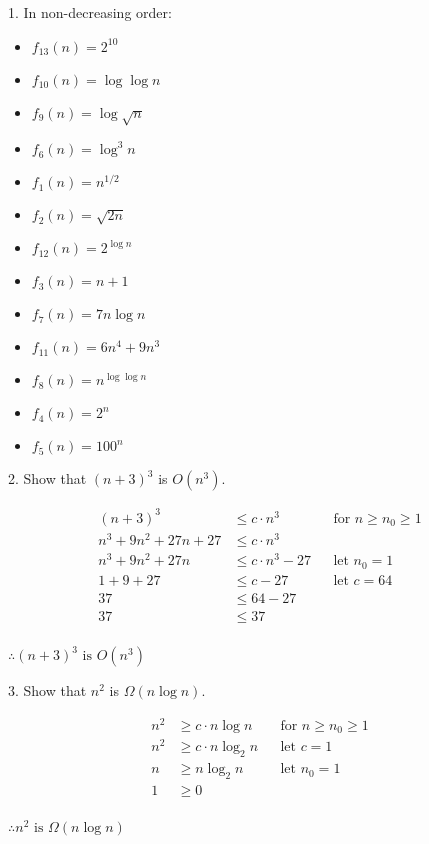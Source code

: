 \documentclass[12pt]{article}
\begin{document}
\begin{flushleft}
1. In non-decreasing order:
\end{flushleft}
\begin{itemize}
	\item $ f_{13}(n)=2^{10} $
    \item $ f_{10}(n)=\log \log n $
    \item $ f_{9}(n)=\log \sqrt{n} $
    \item $ f_{6}(n)=\log^3 n $
    \item $ f_{1}(n)=n^{1/2} $
    \item $ f_{2}(n)=\sqrt{2n} $
    \item $ f_{12}(n)=2^{\log n} $
    \item $ f_{3}(n)=n+1 $
    \item $ f_{7}(n)=7n\log n $
    \item $ f_{11}(n)=6n^4+9n^3 $
    \item $ f_{8}(n)=n^{\log \log n} $
    \item $ f_{4}(n)=2^n $
    \item $ f_{5}(n)=100^n $
\end{itemize}
\newpage

\begin{flushleft}
2. Show that $ (n+3)^3 $ is $ O(n^3) $.
\end{flushleft}
\begin{align*}
(n+3)^3 &\leq c\cdot n^3 &&\text{for } n \geq n_{0} \geq 1\\
n^3+9n^2+27n+27 &\leq c\cdot n^3\\
n^3+9n^2+27n &\leq c\cdot n^3-27 &&\text{let } n_{0}=1 \\
1 + 9 + 27 &\leq c-27 &&\text{let } c=64\\
37 &\leq 64-27\\
37 &\leq 37 \\
\end{align*}
\begin{center}
$ \therefore (n+3)^3 \text{ is } O(n^3) $ \\[1.5in]
\end{center}

\begin{flushleft}
3. Show that $ n^2 $ is $ \Omega(n\log n) $.
\end{flushleft}
\begin{align*}
n^2 &\geq c \cdot n\log n &&\text{for } n\geq n_{0} \geq 1 \\
n^2 &\geq c \cdot n\log_{2} n &&\text{let } c=1\\
n &\geq n\log_{2} n &&\text{let } n_{0}=1\\
1 &\geq 0 \\
\end{align*}
\begin{center}
$ \therefore n^2 \text{ is } \Omega(n\log n) $
\end{center}
\newpage
\end{document}
